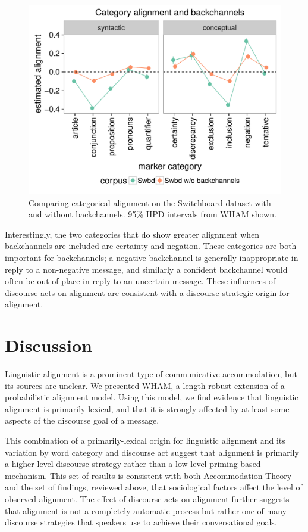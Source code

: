 \documentclass[11pt]{article}
\begin{document}
\begin{figure}[t]
  \begin{center}
    \includegraphics[width=\columnwidth]{results/swbds_line.pdf}\vspace{-10pt}
  \end{center}
  \caption{Comparing categorical alignment on the Switchboard dataset with and without backchannels. 95\% HPD intervals from WHAM shown.}\label{fig:swbds-res}
\end{figure}

Interestingly, the two categories that do show greater alignment when backchannels are included are certainty and negation. These categories are both important for backchannels; a negative backchannel is generally inappropriate in reply to a non-negative message, and similarly a confident backchannel would often be out of place in reply to an uncertain message. These influences of discourse acts on alignment are consistent with a discourse-strategic origin for alignment.

\section{Discussion}
Linguistic alignment is a prominent type of communicative accommodation, but its sources are unclear.  We presented WHAM, a length-robust extension of a probabilistic alignment model. Using this model, we find evidence that linguistic alignment is primarily lexical, and that it is strongly affected by at least some aspects of the discourse goal of a message.

This combination of a primarily-lexical origin for linguistic alignment and its variation by word category and discourse act suggest that alignment is primarily a higher-level discourse strategy rather than a low-level priming-based mechanism.  This set of results is consistent with both Accommodation Theory \cite{GilesCouplandCoupland1991} and the set of findings, reviewed above, that sociological factors affect the level of observed alignment.  The effect of  discourse acts on alignment further suggests that alignment is not a completely automatic process but rather one of many discourse strategies that speakers use to achieve their conversational goals.
\end{document}
